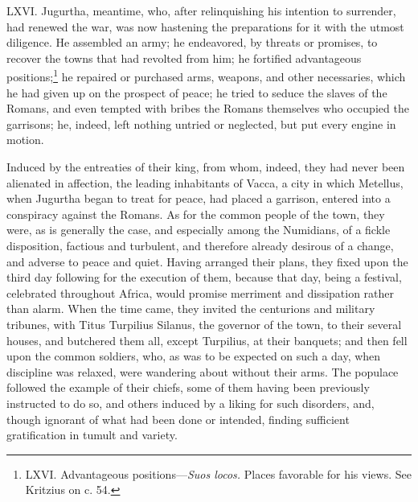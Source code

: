 LXVI. Jugurtha, meantime, who, after relinquishing his intention to
surrender, had renewed the war, was now hastening the preparations for
it with the utmost diligence. He assembled an army; he endeavored, by
threats or promises, to recover the towns that had revolted from him;
he fortified advantageous positions;\footnote{LXVI. Advantageous positions—\emph{Suos locos.} Places favorable
for his views. See Kritzius on c. 54.} he repaired or purchased
arms, weapons, and other necessaries, which he had given up on the
prospect of peace; he tried to seduce the slaves of the Romans, and
even tempted with bribes the Romans themselves who occupied the
garrisons; he, indeed, left nothing untried or neglected, but put
every engine in motion.

Induced by the entreaties of their king, from whom, indeed, they had
never been alienated in affection, the leading inhabitants of Vacca, a
city in which Metellus, when Jugurtha began to treat for peace, had
placed a garrison, entered into a conspiracy against the Romans. As
for the common people of the town, they were, as is generally the
case, and especially among the Numidians, of a fickle disposition,
factious and turbulent, and therefore already desirous of a change,
and adverse to peace and quiet. Having arranged their plans, they
fixed upon the third day following for the execution of them, because
that day, being a festival, celebrated throughout Africa, would
promise merriment and dissipation rather than alarm. When the time
came, they invited the centurions and military tribunes, with Titus
Turpilius Silanus, the governor of the town, to their several houses,
and butchered them all, except Turpilius, at their banquets; and then
fell upon the common soldiers, who, as was to be expected on such a
day, when discipline was relaxed, were wandering about without their
arms. The populace followed the example of their chiefs, some of them
having been previously instructed to do so, and others induced by a
liking for such disorders, and, though ignorant of what had been done
or intended, finding sufficient gratification in tumult and variety.

